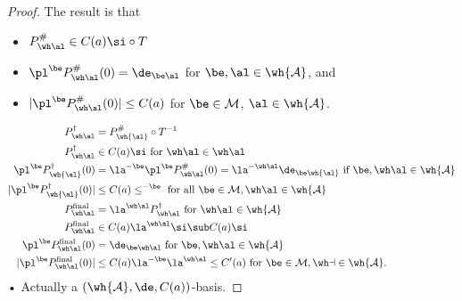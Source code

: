 \begin{proof}
The result is that 
\begin{itemize}
\item
$P^\#_{\wh \al}\in C(a)\si\circ T$
\item
$\pl^\be P_{\wh \al}^\#(0) = \de_{\be\al}$ for $\be,\al\in \wh{\cal A}$, and 
\item
$|\pl^\be P_{\wh \al}^\#(0)|\le C(a)$ for $\be\in \cal M$, $\al\in \wh{\cal A}$.
\end{itemize}
\begin{align}
P_{\wh \al}^\dagger &= P_{\wh{\al}}^\# \circ T^{-1}\\
P_{\wh \al}^\dagger &\in C(a)\si\text{ for }\wh \al\in \wh \al\\
\pl^\be P_{\wh{\al}}^\dagger (0)
&= \la^{-\be}\pl^\be P_{\wh\al}^\#(0)=\la^{-\wh \al}\de_{\be \wh{\al}} \text{ if }\be, \wh\al\in \wh{\cal A}\\
|\pl^\be P_{\wh{\al}}^\dagger (0)|
&\le C(a)\le^{-\be} \text{ for  all }\be\in \cal M,\wh \al \in \wh{\cal A}\\
P_{\wh\al}^{\text{final}}&=\la^{\wh \al}
P_{\wh \al}^\dagger \text{ for }\wh\al\in \wh{\cal A}\\
P_{\wh\al}^{\text{final}}&\in C(a)\la^{\wh \al}\si \sub C(a)\si\\
\pl^\be P_{\wh \al}^{\text{final}}(0)&=\de_{\be\wh\al} \text{ for }\be,\wh \al\in \wh{\cal A}\\
|\pl^\be P_{\wh \al}^{\text{final}}(0)|
&\le C(a)\la^{-\be}\la^{\wh \al}\le C'(a) \text{ for }\be\in \cal M, \wh a\in \wh{\cal A}.
\end{align}•
 Actually a $(\wh {\cal A}, \de, C(a))$-basis.
 
\end{proof}